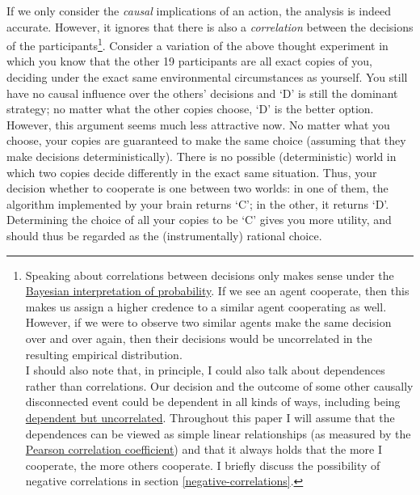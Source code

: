 If we only consider the \emph{causal} implications of an action, the
analysis is indeed accurate. However, it ignores that there is also a
\emph{correlation} between the decisions of the participants\footnote{Speaking
  about correlations between decisions only makes sense under the
  \href{https://en.wikipedia.org/wiki/Bayesian_probability}{Bayesian
  interpretation of probability}. If we see an agent cooperate, then
  this makes us assign a higher credence to a similar agent cooperating
  as well. However, if we were to observe two similar agents make the
  same decision over and over again, then their decisions would be
  uncorrelated in the resulting empirical
  distribution.\\[1\baselineskip]I should also note that, in principle,
  I could also talk about dependences rather than correlations. Our
  decision and the outcome of some other causally disconnected event
  could be dependent in all kinds of ways, including being
  \href{https://stats.stackexchange.com/questions/179511/why-zero-correlation-does-not-necessarily-imply-independence}{dependent
  but uncorrelated}. Throughout this paper I will assume that the
  dependences can be viewed as simple linear relationships (as measured
  by the
  \href{https://en.wikipedia.org/wiki/Pearson_correlation_coefficient}{Pearson
  correlation coefficient}) and that it always holds that the more I
  cooperate, the more others cooperate. I briefly discuss the
  possibility of negative correlations in section
  \ref{negative-correlations}.}. Consider a variation of the above thought
experiment in which you know that the other 19 participants are all
exact copies of you, deciding under the exact same environmental
circumstances as yourself. You still have no causal influence over the
others' decisions and `D' is still the dominant strategy; no matter what
the other copies choose, `D' is the better option. However, this
argument seems much less attractive now. No matter what you choose, your
copies are guaranteed to make the same choice (assuming that they make
decisions deterministically). There is no possible (deterministic) world
in which two copies decide differently in the exact same situation.
Thus, your decision whether to cooperate is one between two worlds: in
one of them, the algorithm implemented by your brain returns `C'; in the
other, it returns `D'. Determining the choice of all your copies to be
`C' gives you more utility, and should thus be regarded as the
(instrumentally) rational choice.

